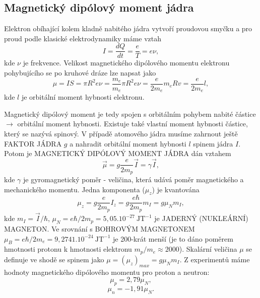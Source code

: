 \documentclass[../../main.tex]{subfiles}
\begin{document}
\subsection{Magnetický dipólový moment jádra}

Elektron obíhající kolem kladně nabitého jádra vytvoří proudovou smyčku a pro proud podle klasické elektrodynamiky máme vztah
\begin{equation}
I = \dfrac{dQ}{dt} = \dfrac{e}{T} = e \nu,
\end{equation}
kde $\nu$ je frekvence. Velikost magnetického dipólového momentu elektronu pohybujícího se po kruhové dráze lze napsat jako 
\begin{equation}
\mu = IS = \pi R^2 e \nu = \dfrac{m_e}{m_e} \pi R^2 e \nu = \dfrac{e}{2 m_e} m_e R v = \dfrac{e}{2 m_e}l,
\end{equation}
kde $l$ je orbitální moment hybnosti elektronu.

Magnetický dipólový moment je tedy spojen s orbitálním pohybem nabité částice $\rightarrow$ orbitální moment hybnosti. Existuje také vlastní moment hybnosti částice, který se nazývá spinový. V případě atomového jádra musíme zahrnout ještě FAKTOR JÁDRA $g$ a nahradit orbitální moment hybnosti $l$ spinem jádra $I$. Potom je MAGNETICKÝ DIPÓLOVÝ MOMENT JÁDRA dán vztahem
\begin{equation}
\vec{\mu} = g \dfrac{e}{2 m_p} \vec{I} = \gamma \vec{I},
\end{equation} 
kde $\gamma$ je gyromagnetický poměr - veličina, která udává poměr magnetického a mechanického momentu. Jedna komponenta ($\mu _z$) je kvantována
\begin{equation}
\mu _z = g \dfrac{e}{2 m_p} I_z = g \dfrac{e \hbar}{2 m_p} m_I = g \mu_N m_I,
\end{equation}
kde $m_I = \vec{I} /\hbar$, $\mu _N = e \hbar /2 m_p = 5, 05.10^{-27} ~\mathrm{JT^{-1}}$ je JADERNÝ (NUKLEÁRNÍ) MAGNETON. Ve srovnání s BOHROVÝM MAGNETONEM $\mu_B = e \hbar / 2 m_e  = 9,2741.10^{-24} ~\mathrm{JT^{-1}}$ je 200-krát menší (je to dáno poměrem hmotnosti protonu k hmotnosti elektronu $m_p /m_e \approx 2000$). Skalární veličina $\mu$ se definuje ve shodě se spinem jako $\mu = (\mu_z) _{max} = g \mu_N m_I$. Z experimentů máme hodnoty magnetického dipólového momentu pro proton a neutron:
\begin{equation}
\mu _p = 2, 79 \mu _N,
\end{equation}
\begin{equation}
\mu _n = -1,91 \mu_N.
\end{equation}
\end{document}
